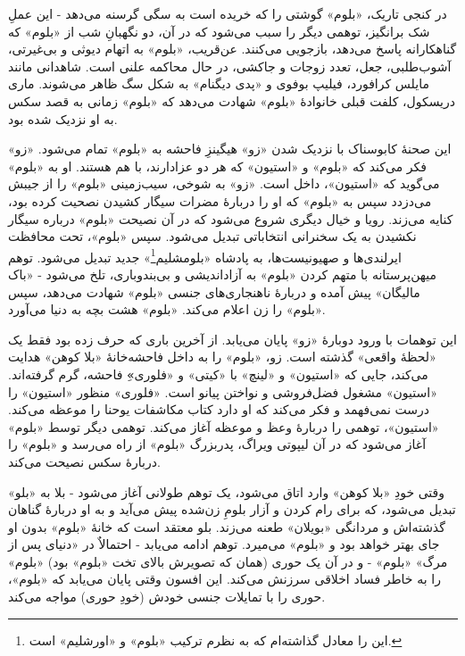 \documentclass[12pt]{book}
\newcommand{\noun}[1]{«{#1}»}
\begin{document}
    در کنجی تاریک، \noun{بلوم} گوشتی را که خریده است به سگی گرسنه می‌دهد - این عملِ شک برانگیز، توهمی دیگر را سبب می‌شود که در آن، دو نگهبانِ شب از \noun{بلوم} که گناهکارانه پاسخ می‌دهد، بازجویی می‌کنند. عن‌قریب، \noun{بلوم} به اتهام دیوثی و بی‌غیرتی، آشوب‌طلبی، جعل، تعدد زوجات و جاکشی، در حال محاکمه علنی است. شاهدانی مانند مایلس کرافورد، فیلیپ بوفوی و \noun{پدی دیگنام} به شکل سگ ظاهر می‌شوند. ماری دریسکول، کلفت قبلی خانوادۀ \noun{بلوم} شهادت می‌دهد که \noun{بلوم} زمانی به قصد سکس به او نزدیک شده بود.

    این صحنۀ کابوسناک با نزدیک شدن \noun{زو} هیگینزِ فاحشه به \noun{بلوم} تمام می‌شود. \noun{زو} فکر می‌کند که \noun{بلوم} و \noun{استیون} که هر دو عزادارند، با هم هستند. او به \noun{بلوم} می‌گوید که \noun{استیون}، داخل است. \noun{زو} به شوخی، سیب‌زمینی \noun{بلوم} را از جیبش می‌دزدد سپس به \noun{بلوم} که او را دربارۀ مضرات سیگار کشیدن نصحیت کرده بود، کنایه می‌زند. رویا و خیال دیگری شروع می‌شود که در آن نصیحت \noun{بلوم} درباره سیگار نکشیدن به یک سخنرانی انتخاباتی تبدیل می‌شود. سپس \noun{بلوم}، تحت محافظت ایرلندی‌ها و صهیونیست‌ها، به پادشاه «بلومشلیم\footnote{این را معادل  گذاشته‌ام که به نظرم ترکیب «بلوم»  و «اورشلیم»  است.}» جدید تبدیل می‌شود. توهم میهن‌پرستانه با متهم کردن \noun{بلوم} به آزاداندیشی و بی‌بندوباری، تلخ می‌شود - \noun{باک مالیگان‬} پیش آمده و دربارۀ ناهنجاری‌های جنسی \noun{بلوم} شهادت می‌دهد، سپس \noun{بلوم} را زن اعلام می‌کند. \noun{بلوم} هشت بچه به دنیا می‌آورد.

    این توهمات با ورود دوبارۀ \noun{زو} پایان می‌یابد. از آخرین باری که حرف زده بود فقط یک «لحظۀ واقعی» گذشته است. زو، \noun{بلوم} را به داخل فاحشه‌خانۀ \noun{بلا کوهن} هدایت می‌کند، جایی که \noun{استیون} و \noun{لینچ} با \noun{کیتی} و \noun{فلوری}ِ فاحشه، گرم گرفته‌اند. \noun{استیون} مشغول فضل‌فروشی و نواختن پیانو است. \noun{فلوری} منظور \noun{استیون} را درست نمی‌فهمد و فکر می‌کند که او دارد کتاب مکاشفات یوحنا را موعظه می‌کند. \noun{استیون}، توهمی را دربارۀ وعظ و موعظه آغاز می‌کند. توهمی دیگر توسط \noun{بلوم} آغاز می‌شود که در آن لیپوتی ویراگ، پدربزرگ \noun{بلوم} از راه می‌رسد و \noun{بلوم} را دربارۀ سکس نصیحت می‌کند.

    وقتی خودِ \noun{بلا کوهن} وارد اتاق می‌شود، یک توهم طولانی آغاز می‌شود - بلا به «بلو» تبدیل می‌شود، که برای رام کردن و آزار بلومِ زن‌شده پیش می‌آید و به او دربارۀ گناهان گذشته‌اش و مردانگی \noun{بویلان} طعنه می‌زند. بلو معتقد است که خانۀ \noun{بلوم} بدون او جای بهتر خواهد بود و \noun{بلوم} می‌میرد. توهم ادامه می‌یابد - احتمالاٌ در «دنیای پس از مرگ» \noun{بلوم} - و در آن یک حوری (همان که تصویرش بالای تخت \noun{بلوم} بود) \noun{بلوم} را به خاطر فساد اخلاقی سرزنش می‌کند. این افسون وقتی پایان می‌یابد که \noun{بلوم}، حوری را با تمایلات جنسی خودش (خودِ حوری) مواجه می‌کند.
\end{document}
